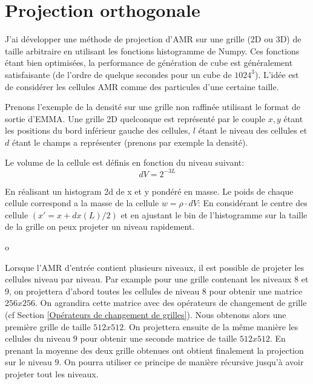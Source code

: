 \section{Projection orthogonale}

J'ai développer une méthode de projection d'AMR sur une grille (2D ou 3D) de taille arbitraire en utilisant les fonctions histogramme de Numpy.
Ces fonctions étant bien optimisées, la performance de génération de cube est généralement satisfaisante (de l'ordre de quelque secondes pour un cube de $1024^3$).
L'idée est de considérer les cellules AMR comme des particules d'une certaine taille.

Prenons l'exemple de la densité sur une grille non raffinée utilisant le format de sortie d'EMMA.
Une grille 2D quelconque est représenté par le couple $x,y$ étant les positions du bord inférieur gauche des cellules, $l$ étant le niveau des cellules et $d$ étant le champs a représenter (prenons par exemple la densité).

Le volume de la cellule est définis en fonction du niveau suivant:
\begin{equation}
dV= 2^{-3L}
\end{equation} 


En réalisant un histogram 2d de x et y pondéré en masse.
Le poids de chaque cellule correspond a la masse de la cellule $w = \rho \cdot dV$:
En considérant le centre des cellule $(x' = x+dx(L) /2)$ et en ajustant le bin de l’histogramme sur la taille de la grille on peux projeter un niveau rapidement.

o%


Lorsque l'AMR d'entrée contient plusieurs niveaux, il est possible de projeter les cellules niveau par niveau.
Par example pour une grille contenant les niveaux 8 et 9, on projettera d'abord toutes les cellules de niveau 8 pour obtenir une matrice $256x256$.
On agrandira cette matrice avec des opérateurs de changement de grille (cf Section \ref{Opérateurs de changement de grilles}).
Nous obtenons alors une première grille de taille $512x512$.
On projettera ensuite  de la même manière les cellules du niveau $9$ pour obtenir une seconde matrice de taille $512x512$.
En prenant la moyenne des deux grille obtenues ont obtient finalement la projection sur le niveau $9$.
On pourra utiliser ce principe de manière récursive jusqu'à avoir projeter tout les niveaux.

